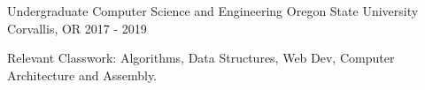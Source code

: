 

\begin{cventries}

  \cventry
    {Undergraduate Computer Science and Engineering} %
    {Oregon State University} %
    {Corvallis, OR} %
    {2017 - 2019} %
    {
      \begin{cvitems} %
        \item {Relevant Classwork: Algorithms, Data Structures, Web Dev, Computer Architecture and Assembly.}
      \end{cvitems}
    }

\end{cventries}
